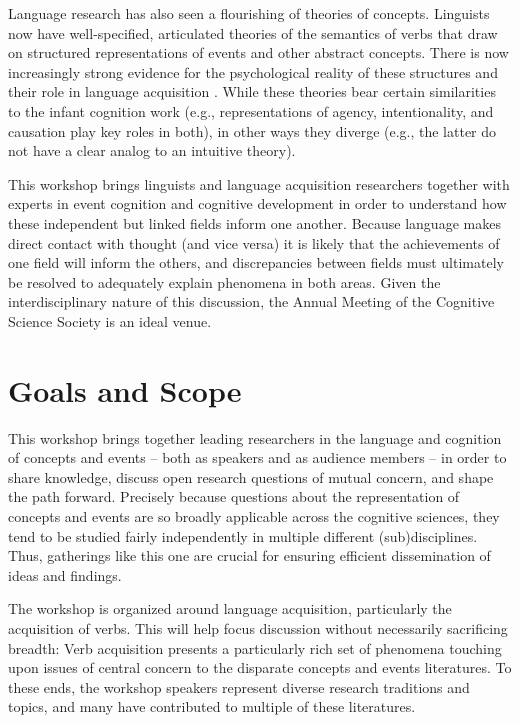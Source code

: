\documentclass[10pt,letterpaper]{article}
\begin{document}
Language research has also seen a flourishing of theories of
concepts. Linguists now have well-specified, articulated theories of
the semantics of verbs that draw on structured representations of events and other abstract concepts\cite{Levin2011,Levin2005}. There is now increasingly strong evidence for the psychological reality of these structures and their role in language acquisition
\cite{Ambridge2013,HOSULS}. While these theories bear certain
similarities to the infant cognition work (e.g., representations of
agency, intentionality, and causation play key roles in both), in other ways
they diverge (e.g., the latter do not have a clear analog to an intuitive theory). 

This workshop brings linguists and language acquisition researchers
together with experts in event cognition and
cognitive development in order to understand how
these independent but linked fields inform one
another. Because language makes direct contact with thought (and vice versa) it is likely that the achievements of one
field will inform the others, and discrepancies between fields must
ultimately be resolved to adequately explain phenomena in both areas. Given
the interdisciplinary nature of this discussion, the Annual
Meeting of the Cognitive Science Society is an ideal venue.

\section{Goals and Scope}

This workshop brings together leading researchers in the language and
cognition of concepts and events -- both as speakers and as audience
members -- in order to share knowledge, discuss open research
questions of mutual concern, and shape the path forward. Precisely
because questions about the representation of concepts and events are
so broadly applicable across the cognitive sciences, they tend to be
studied fairly independently in multiple different (sub)disciplines. Thus,
gatherings like this one are crucial for ensuring efficient
dissemination of ideas and findings.

The workshop is organized around language acquisition, particularly
the acquisition of verbs. This will help focus discussion without
necessarily sacrificing breadth: Verb acquisition presents a
particularly rich set of phenomena touching upon issues of central
concern to the disparate concepts and events literatures. To these ends, the workshop speakers represent diverse research
traditions and topics, and many have contributed to multiple of these literatures.
\end{document}
